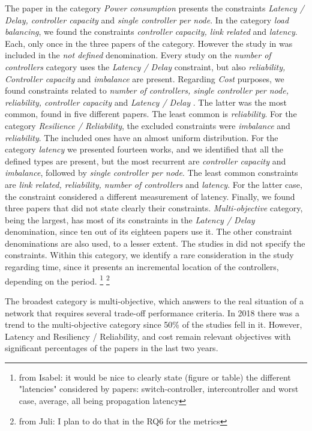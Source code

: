 \documentclass{IEEEtran}
\newcommand\fia[1]{{\color{red}\footnote{\color{red}from Isabel: #1}}} %
\newcommand\juli[1]{{\color{magenta}\footnote{\color{magenta}from Juli: #1}}}
\newcommand\delia[1]{{\tiny{\color{red}#1}}} %
\begin{document}
The paper in the category \textit{Power consumption} presents the constraints \textit{Latency / Delay, controller capacity} and \textit{single controller per node}.
In the category \textit{load balancing}, we found the constraints \textit{controller capacity, link related} and \textit{latency}. \delia{Each, only once  in the three papers of the category.} However the study in \cite{WoLi15} was included in the \textit{not defined} denomination.
Every study on the \textit{number of controllers} category uses the \textit{Latency / Delay} constraint, but also \textit{reliability, Controller capacity} and \textit{imbalance} are present. 
Regarding \textit{Cost} purposes, we found constraints related to \textit{number of controllers, single controller per node, reliability, controller capacity} and  \textit{Latency / Delay
}. The latter was the most common, found in five different papers. The least common is \textit{reliability}.
For the category \textit{Resilience / Reliability}, the excluded constraints were \textit{imbalance} and \textit{reliability}. The included ones have an almost uniform distribution. 
For the category \textit{latency} we presented fourteen works, and we identified that all the defined types are present, but the most recurrent are \textit{controller capacity} and \textit{imbalance}, followed by \textit{single controller per node}. The least common constraints are \textit{link related, reliability, number of controllers} and \textit{latency}. For the latter case, the constraint considered a different measurement of latency. Finally, we found three papers \cite{SaSa17,WaZh17,HeSh12} that did not state clearly their constraints.
\textit{Multi-objective} category, being the largest, has most of its constraints in the \textit{Latency / Delay} denomination, since ten out of its eighteen papers use it. The other constraint denominations are also used, to a lesser extent. The studies in \cite{AhJa15, HeSh12, HoHa13} did not specify the constraints. Within this category, we identify a rare consideration in the study \cite{TaMo18} regarding time, since it presents an incremental location of the controllers, depending on the period.
\fia{it would be nice to clearly state (figure or table) the different "latencies" considered by papers: switch-controller, intercontroller and worst case, average, all being propagation latency} \juli{I plan to do that in the RQ6 for the metrics}

The broadest category is multi-objective, which answers to the real situation of a network that requires several trade-off performance criteria. In 2018 there was a trend to the multi-objective category since 50\%  of the studies fell in it. However, Latency and Resiliency / Reliability, and cost remain relevant objectives with significant percentages of the papers in the last two years. 
\end{document}
